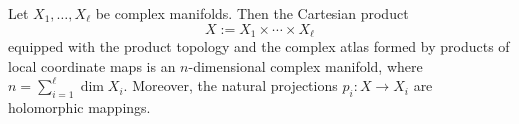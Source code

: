 Let $X_1, \ldots, X_\ell$ be complex manifolds. Then the Cartesian product
$$X := X_1 \times \cdots \times X_\ell$$
equipped with the product topology and the complex atlas formed by products of local coordinate maps is an $n$-dimensional complex manifold, where $n = \sum_{i=1}^\ell \dim X_i$. Moreover, the natural projections $p_i: X \to X_i$ are holomorphic mappings.
